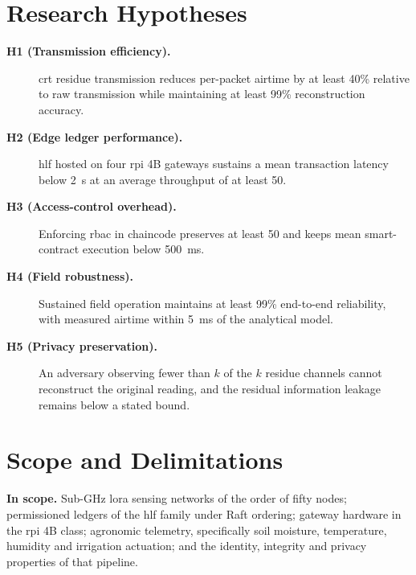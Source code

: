 \section{Research Hypotheses}
\label{sec:hypotheses}

\begin{description}
  \item[\textnormal{\textbf{H1 (Transmission efficiency).}}] \gls{crt} residue
        transmission reduces per-packet airtime by at least 40\% relative to raw
        transmission while maintaining at least 99\% reconstruction accuracy.

  \item[\textnormal{\textbf{H2 (Edge ledger performance).}}] \gls{hlf} hosted on
        four \gls{rpi} 4B gateways sustains a mean transaction latency below
        \SI{2}{\second} at an average throughput of at least \SI{50}{\tps}.

  \item[\textnormal{\textbf{H3 (Access-control overhead).}}] Enforcing
        \gls{rbac} in chaincode preserves at least \SI{50}{\tps} and keeps mean
        smart-contract execution below \SI{500}{\milli\second}.

  \item[\textnormal{\textbf{H4 (Field robustness).}}] Sustained field operation
        maintains at least 99\% end-to-end reliability, with measured airtime
        within \SI{5}{\milli\second} of the analytical model.

  \item[\textnormal{\textbf{H5 (Privacy preservation).}}] An adversary observing
        fewer than $k$ of the $k$ residue channels cannot reconstruct the
        original reading, and the residual information leakage remains below a
        stated bound.
\end{description}


\section{Scope and Delimitations}
\label{sec:scope}

\textbf{In scope.} Sub-GHz \gls{lora} sensing networks of the order of fifty
nodes; permissioned ledgers of the \gls{hlf} family under Raft ordering;
gateway hardware in the \gls{rpi} 4B class; agronomic telemetry, specifically
soil moisture, temperature, humidity and irrigation actuation; and the
identity, integrity and privacy properties of that pipeline.

